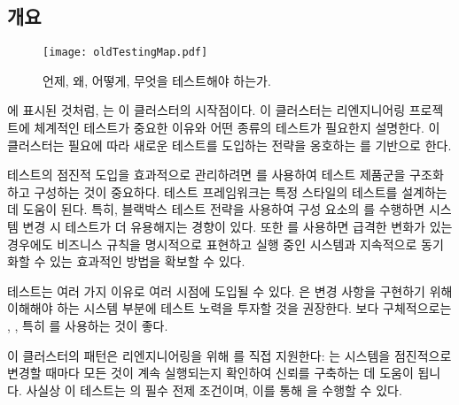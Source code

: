 \documentclass[a4paper,10pt,twoside]{book}
\begin{document}
\subsection*{개요}

\begin{figure}
\begin{center}
\texttt{[image: oldTestingMap.pdf]}
\caption{언제, 왜, 어떻게, 무엇을 테스트해야 하는가.}
\end{center}
\end{figure}

에 표시된 것처럼, 는 이 클러스터의 시작점이다. 이 클러스터는 리엔지니어링 프로젝트에 체계적인 테스트가 중요한 이유와 어떤 종류의 테스트가 필요한지 설명한다. 이 클러스터는 필요에 따라 새로운 테스트를 도입하는 전략을 옹호하는 를 기반으로 한다.

테스트의 점진적 도입을 효과적으로 관리하려면 를 사용하여 테스트 제품군을 구조화하고 구성하는 것이 중요하다. 테스트 프레임워크는 특정 스타일의 테스트를 설계하는 데 도움이 된다. 특히, 블랙박스 테스트 전략을 사용하여 구성 요소의 를 수행하면 시스템 변경 시 테스트가 더 유용해지는 경향이 있다. 또한 를 사용하면 급격한 변화가 있는 경우에도 비즈니스 규칙을 명시적으로 표현하고 실행 중인 시스템과 지속적으로 동기화할 수 있는 효과적인 방법을 확보할 수 있다.

테스트는 여러 가지 이유로 여러 시점에 도입될 수 있다. 은 변경 사항을 구현하기 위해 이해해야 하는 시스템 부분에 테스트 노력을 투자할 것을 권장한다. 보다 구체적으로는 , , 특히 를 사용하는 것이 좋다.

이 클러스터의 패턴은 리엔지니어링을 위해 를 직접 지원한다: 는 시스템을 점진적으로 변경할 때마다 모든 것이 계속 실행되는지 확인하여 신뢰를 구축하는 데 도움이 됩니다. 사실상 이 테스트는 의 필수 전제 조건이며, 이를 통해 을 수행할 수 있다.
\end{document}
